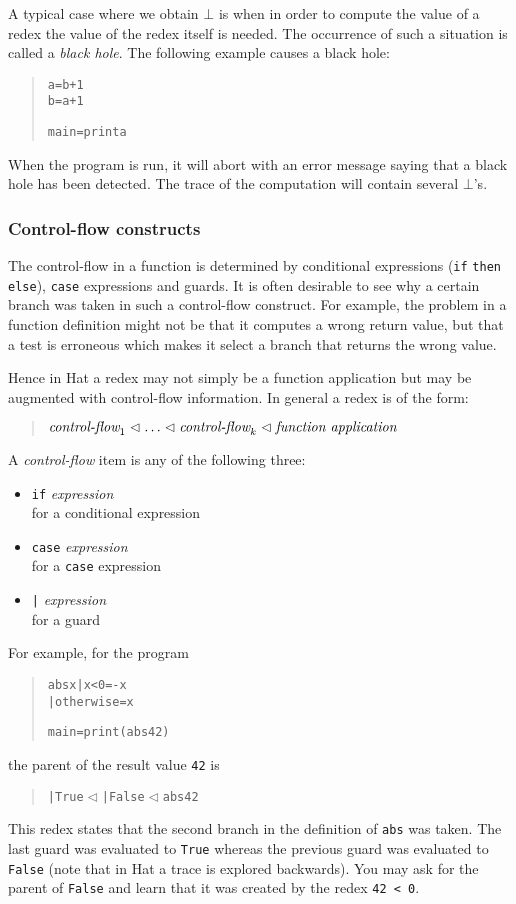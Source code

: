 \documentclass[12pt]{article}
\newenvironment{code}{\begin{quote}\begin{alltt}}{\end{alltt}\end{quote}}
\newcommand{\within}{\vartriangleleft}
\begin{document}
A typical case where we obtain $\bot$ is when in order to compute the value of a redex the value of the redex itself is needed. The occurrence of such a situation is called a \emph{black hole}. The following example causes a black hole:

\begin{code}
a = b + 1
b = a + 1

main = print a
\end{code}

When the program is run, it will abort with an error message saying that a black hole has been detected. The trace of the computation will contain several $\bot$'s.


\subsubsection{Control-flow constructs}

The control-flow in a function is determined by conditional expressions (\texttt{if} \texttt{then} \texttt{else}), \texttt{case} expressions and guards. 
It is often desirable to see why a certain branch was taken in such a control-flow construct. For example, the problem in a function definition might not be that it computes a wrong return value, but that a test is erroneous which makes it select a branch that returns the wrong value. 

Hence in Hat a redex may not simply be a function application but may be augmented with control-flow information. In general a redex is of the form:
\begin{quote}
$\emph{control-flow}_1 \within \ldots \within \emph{control-flow}_k 
\within \emph{function application}$
\end{quote}
A \emph{control-flow} item is any of the following three:
\begin{itemize}
\item \texttt{if} \emph{expression}\\
for a conditional expression
\item \texttt{case} \emph{expression}\\
for a \texttt{case} expression
\item \texttt{|} \emph{expression}\\
for a guard
\end{itemize}
%
For example, for the program
\begin{code} 
abs x | x < 0 = -x
      | otherwise = x 

main = print (abs 42)
\end{code}
the parent of the result value \texttt{42} is
\begin{code}
| True \(\within\) | False \(\within\) abs 42
\end{code}
This redex states that the second branch in the definition of \texttt{abs} was taken. The last guard was evaluated to \texttt{True} whereas the previous guard was evaluated to \texttt{False} (note that in Hat a trace is explored backwards). You may ask for the parent of \texttt{False} and learn that it was created by the redex \texttt{42 < 0}.
\end{document}
